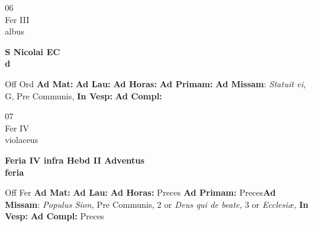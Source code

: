\documentclass[10pt, openany]{book}
\begin{document}
    \begin{center}
        \begin{minipage}{3.5in}
            \vspace{2em}
            \begin{minipage}{0.5in}
                {\Huge 06} \\
                {\normalsize Fer III} \\
                {\normalsize albus}
            \end{minipage}
            \begin{minipage}{3.0in}
                \textbf{ \large S Nicolai EC \\
                \textnormal{\normalsize d}} \\ 
            \end{minipage}
            \begin{justify}Off Ord
                \textbf{Ad Mat: }
                \textbf{Ad Lau: }
                \textbf{Ad Horas: }
                \textbf{Ad Primam: }\textbf{Ad Missam}: \textit{Statuit ei,} G, Pre Communis,  
                \textbf{In Vesp: }
                \textbf{Ad Compl: }
            \end{justify}
        \end{minipage}
    \end{center}

    \begin{center}
        \begin{minipage}{3.5in}
            \vspace{2em}
            \begin{minipage}{0.5in}
                {\Huge 07} \\
                {\normalsize Fer IV} \\
                {\normalsize violaceus}
            \end{minipage}
            \begin{minipage}{3.0in}
                \textbf{ \large Feria IV infra Hebd II Adventus \\
                \textnormal{\normalsize feria}} \\ 
            \end{minipage}
            \begin{justify}Off Fer
                \textbf{Ad Mat: }
                \textbf{Ad Lau: }
                \textbf{Ad Horas: }Preces
                \textbf{Ad Primam: }Preces\textbf{Ad Missam}: \textit{Populus Sion,} Pre Communis, 2 or \textit{Deus qui de beate,} 3 or \textit{Ecclesiæ,}  
                \textbf{In Vesp: }
                \textbf{Ad Compl: }Preces
            \end{justify}
        \end{minipage}
    \end{center}
\end{document}
